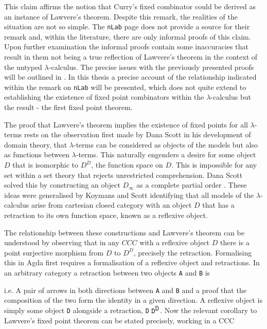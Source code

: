 This claim affirms the notion that Curry's fixed combinator could be derived as
an instance of Lawvere's theorem. Despite this remark, the realities of the
situation are not so simple. The \verb|nLab| page does not provide a source for
their remark and, within the literature, there are only informal proofs of this
claim. Upon further examination the informal proofs contain some inaccuracies
that result in them not being a true reflection of Lawvere's theorem in the
context of the untyped $\lambda$-calculus. The precise issues with the
previously presented proofs will be outlined in . In this
thesis a precise account of the relationship indicated within
the remark on \verb|nLab| will be presented, which does not quite extend to establishing the
existence of fixed point combinators within the $\lambda$-calculus but the
result - the first fixed point theorem.

The proof that Lawvere's theorem implies the existence of fixed points for all
$\lambda$-terms rests on the observation first made by Dana Scott in his
development of domain theory, that $\lambda$-terms can be considered as objects
of the models but also as functions between $\lambda$-terms. This naturally
engenders a desire for some object $D$ that is isomorphic to $D^D$, the function
space on $D$. This is impossible for any set within a set theory that rejects
unrestricted comprehension. Dana Scott solved this by constructing an object
$D_{\infty}$ as a complete partial order . These
ideas were generalised by Koymans and Scott identifying that all models of the
$\lambda$-calculus arise from cartesian closed category with an object $D$ that
has a retraction to its own function space, known as a reflexive object.


The relationship between these constructions and Lawvere's theorem can be
understood by observing that in any $CCC$ with a reflexive object $D$ there is a
point surjective morphism from $D$ to $D^D$, precisely the retraction.
Formalising this in Agda first requires a formalisation of a reflexive object
and retractions. In an arbitrary category a retraction between two objects
\verb|A| and \verb|B| is


i.e. A pair of arrows in both directions between \verb|A| and \verb|B| and a
proof that the composition of the two form the identity in a given direction.
A reflexive object is simply some object \verb|D| alongside a retraction,
 \verb|D| $\verb|D|^{\verb|D|}$. Now the relevant
corollary to Lawvere's fixed point theorem can be stated precisely, working in a
CCC


